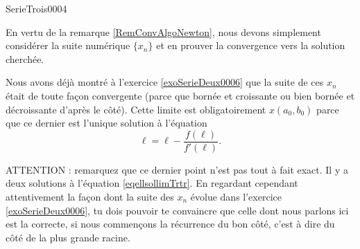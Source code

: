 
\begin{corrige}{SerieTrois0004}

	En vertu de la remarque \ref{RemConvAlgoNewton}, nous devons simplement considérer la suite numérique $\{ x_n\}$ et en prouver la convergence vers la solution cherchée.

	Nous avons déjà montré à l'exercice \ref{exoSerieDeux0006} que la suite de ces $x_n$ était de toute façon convergente (parce que bornée et croissante ou bien bornée et décroissante d'après le côté). Cette limite est obligatoirement $x(a_0,b_0)$ parce que ce dernier est l'unique solution à l'équation
	\begin{equation}		\label{eqellsollimTrtr}
		\ell=\ell-\frac{ f(\ell) }{ f'(\ell) }.
	\end{equation}
	
	ATTENTION : remarquez que ce dernier point n'est pas tout à fait exact. Il y a deux solutions à l'équation \eqref{eqellsollimTrtr}. En regardant cependant attentivement la façon dont la suite des $x_n$ évolue dans l'exercice \ref{exoSerieDeux0006}, tu dois pouvoir te convaincre que celle dont nous parlons ici est la correcte, si nous commençons la récurrence du bon côté, c'est à dire du côté de la plus grande racine.

\end{corrige}
